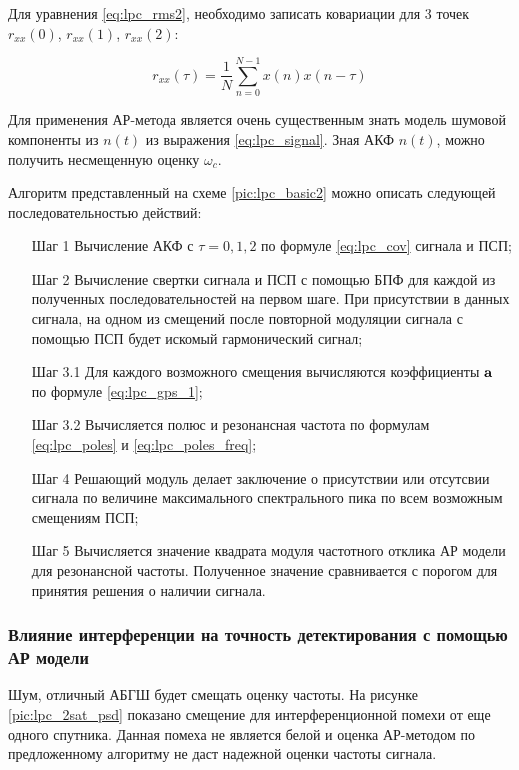 Для уравнения \ref{eq:lpc_rms2}, необходимо записать ковариации для 3 точек
${r_{xx}(0)}$, ${r_{xx}(1)}$, ${r_{xx}(2)}$:

\begin{center}
\begin{equation}
	\label{eq:lpc_cov}
	{r_{xx}(\tau) = \frac{1}{N} \sum \limits_{n=0}^{N-1} x(n) x(n-\tau)}
\end{equation}
\end{center}

Для применения АР-метода является очень существенным знать модель шумовой компоненты из ${n(t)}$ из выражения
\ref{eq:lpc_signal}. Зная АКФ ${n(t)}$, можно получить несмещенную оценку ${\omega_c}$.

Алгоритм представленный на схеме \ref{pic:lpc_basic2} можно описать следующей последовательностью действий:
\begin{itemize}
	\item[Шаг 1] Вычисление АКФ с ${\tau = 0, 1, 2}$ по формуле \ref{eq:lpc_cov} сигнала и ПСП;
	\item[Шаг 2] Вычисление свертки сигнала и ПСП с помощью БПФ для каждой из полученных последовательностей
			на первом шаге. При присутствии в данных сигнала, на одном из смещений после
			повторной модуляции сигнала с помощью ПСП будет искомый гармонический сигнал;
	\item[Шаг 3.1] Для каждого возможного смещения вычисляются коэффициенты ${\bf{a}}$ по формуле
			\ref{eq:lpc_gps_1};
	\item[Шаг 3.2] Вычисляется полюс и резонансная частота по формулам \ref{eq:lpc_poles} и \ref{eq:lpc_poles_freq};
	\item[Шаг 4] Решающий модуль делает заключение о присутствии или отсутсвии сигнала по величине
			максимального спектрального пика по всем возможным смещениям ПСП;
	\item[Шаг 5] Вычисляется значение квадрата модуля частотного отклика АР модели для резонансной частоты.
			Полученное значение сравнивается с порогом для принятия решения о наличии сигнала.
\end{itemize}

\subsubsection{Влияние интерференции на точность детектирования с помощью АР модели}

Шум, отличный АБГШ будет смещать оценку частоты. На рисунке \ref{pic:lpc_2sat_psd} показано
смещение для интерференционной помехи от еще одного спутника. Данная помеха не является белой и
оценка АР-методом по предложенному алгоритму не даст надежной оценки частоты сигнала.

